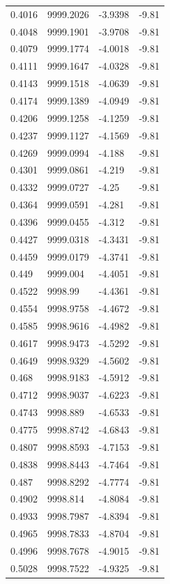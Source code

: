 \begin{table}[H]
\begin{tabular}{llll}
0.4016 & 9999.2026 & -3.9398 & -9.81 \\
0.4048 & 9999.1901 & -3.9708 & -9.81 \\
0.4079 & 9999.1774 & -4.0018 & -9.81 \\
0.4111 & 9999.1647 & -4.0328 & -9.81 \\
0.4143 & 9999.1518 & -4.0639 & -9.81 \\
0.4174 & 9999.1389 & -4.0949 & -9.81 \\
0.4206 & 9999.1258 & -4.1259 & -9.81 \\
0.4237 & 9999.1127 & -4.1569 & -9.81 \\
0.4269 & 9999.0994 & -4.188 & -9.81 \\
0.4301 & 9999.0861 & -4.219 & -9.81 \\
0.4332 & 9999.0727 & -4.25 & -9.81 \\
0.4364 & 9999.0591 & -4.281 & -9.81 \\
0.4396 & 9999.0455 & -4.312 & -9.81 \\
0.4427 & 9999.0318 & -4.3431 & -9.81 \\
0.4459 & 9999.0179 & -4.3741 & -9.81 \\
0.449 & 9999.004 & -4.4051 & -9.81 \\
0.4522 & 9998.99 & -4.4361 & -9.81 \\
0.4554 & 9998.9758 & -4.4672 & -9.81 \\
0.4585 & 9998.9616 & -4.4982 & -9.81 \\
0.4617 & 9998.9473 & -4.5292 & -9.81 \\
0.4649 & 9998.9329 & -4.5602 & -9.81 \\
0.468 & 9998.9183 & -4.5912 & -9.81 \\
0.4712 & 9998.9037 & -4.6223 & -9.81 \\
0.4743 & 9998.889 & -4.6533 & -9.81 \\
0.4775 & 9998.8742 & -4.6843 & -9.81 \\
0.4807 & 9998.8593 & -4.7153 & -9.81 \\
0.4838 & 9998.8443 & -4.7464 & -9.81 \\
0.487 & 9998.8292 & -4.7774 & -9.81 \\
0.4902 & 9998.814 & -4.8084 & -9.81 \\
0.4933 & 9998.7987 & -4.8394 & -9.81 \\
0.4965 & 9998.7833 & -4.8704 & -9.81 \\
0.4996 & 9998.7678 & -4.9015 & -9.81 \\
0.5028 & 9998.7522 & -4.9325 & -9.81 \\

\end{tabular}
\end{table}
